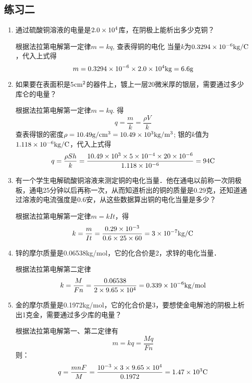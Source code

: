 \subsection{练习二}
\begin{enumerate}
    \item 通过硫酸铜溶液的电量是$2.0\times10^4$库，在阴极上能析出多少克铜？

    \begin{solution}
根据法拉第电解第一定律$m=kq$, 查表得铜的电化
当量$k$为$0.3294\times10^{-6}{\rm kg/C}$，代入上式得
\[m=0.3294\times10^{-6}\times2.0\times10^4{\rm kg}=6.6{\rm g}\]
    \end{solution}
    
    \item 如果要在表面积是5${\rm cm^2}$的器件上，镀上一层20微米厚的银层，需要通过多少库仑的电量？

    \begin{solution}
    根据法拉第电解第一定律$m=kq$. 得
    \[q=\frac{m}{k}=\frac{\rho V}{k}\]
查表得银的密度$\rho=10.49{\rm g/cm^3}=10.49\times10^3{\rm kg/m^3}$; 
银的$k$值为$1.118\times10^{-6}{\rm kg/C}$，代入上式得
\[q=\frac{\rho Sh}{k}=\frac{10.49\times10^3\times 5\times 10^{-4}\times 20\times 10^{-6}}{1.118\times10^{-6}}=94{\rm C}\]
    \end{solution}
    
    \item 有一个学生电解硫酸铜溶液来测定铜的电化当量．他在通电以前称一次阴极板，通电25分钟以后再称一次，从而知道析出的铜的质量是0.29克，还知道通过溶液的电流强度是0.6安，从这些数据算出铜的电化当量是多少？

    \begin{solution}
        根据法拉第电解第一定律$m=kIt$，得
        \[k=\frac{m}{It}=\frac{0.29\times 10^{-3}}{0.6\times 25\times 60}=3\times 10^{-7}{\rm kg/C}\]
    \end{solution}
    
    \item 锌的摩尔质量是0.06538kg/mol，它的化合价是2，求锌的电化当量．

    \begin{solution}
        根据法拉第电解第二定律
\[k=\frac{M}{Fn}=\frac{0.06538}{2\times9.65\times10^4}=0.339\times10^{-6}{\rm kg/mol}
\]
    \end{solution}
    
    \item 金的摩尔质量是0.1972kg/mol，它的化合价是3，要想使金电解池的阴极上析出1克金，需要通过多少库的电量？

    \begin{solution}
        根据法拉第电解第一、第二定律有
        \[m=kq=\frac{Mq}{Fn}\]
        则：
\[q=\frac{mnF}{M}=\frac{10^{-3}\times 3\times 9.65\times 10^4}{0.1972}=1.47\times 10^3{\rm C}\]
    \end{solution}
    
\end{enumerate}

